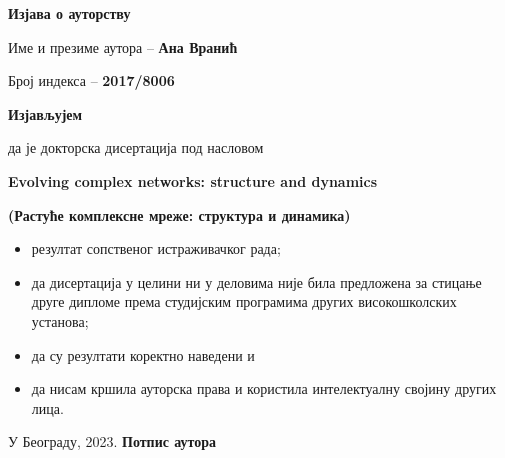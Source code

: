 
\cleardoublepage

\thispagestyle{empty}
\setlength{\parindent}{0pt}

\renewcommand{\headrulewidth}{0pt}


\normalsize

\mbox{}
\vspace{1cm}


\begin{center}
\begin{Large}\textbf{Изјава о ауторству}
\end{Large}\end{center}

\vspace{1.5cm}

Име и презиме аутора -- \textbf{Ана Вранић}

Број индекса -- \textbf{2017/8006}

\vspace{.7cm}

\begin{center}
\textbf{Изјављујем}            \end{center}

да је докторска дисертација под насловом 


\textbf{ Evolving complex networks: structure and dynamics}


\textbf{(Растуће комплексне мреже: структура и динамика)}

\begin{itemize}
 \item резултат сопственог истраживачког рада;
\item  да дисертација у целини 
ни у деловима није била предложена за стицање друге дипломе према студијским 
програмима других високошколских установа;
\item да су резултати коректно наведени и 
\item да нисам кршила ауторска права и користила интелектуалну својину 
других лица.
\end{itemize}

\vfill
 
У Београду, \hspace{1cm} 2023.  \hfill  \textbf{Потпис
аутора\hspace{2cm}\mbox{}}

\vspace{.5cm}
\hspace{10cm}\hrulefill 

\hspace{\fill}



